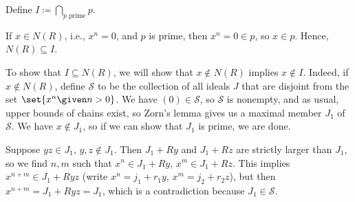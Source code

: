 Define $I\coloneqq \bigcap_{p\text{ prime}} p$.

If $x \in N(R)$, i.e., $x^n = 0$, and $p$ is prime, then $x^n = 0 \in p$, so
$x \in p$. Hence, $N(R) \subseteq I$.

To show that $I \subseteq N(R)$, we will show that $x \notin N(R)$ implies
$x \notin I$. Indeed, if $x \notin N(R)$, define $\mathcal{S}$ to be the collection
of all ideals $J$ that are disjoint from the set $\set{x^n \given n > 0}$.
We have $(0) \in \mathcal{S}$, so $\mathcal{S}$ is nonempty, and as usual,
upper bounds of chains exist, so Zorn's lemma gives us a maximal member
$J_1$ of $\mathcal{S}$. We have $x \notin J_1$, so if we can show that $J_1$ is
prime, we are done.

Suppose $yz \in J_1$, $y, z \notin J_1$. Then $J_1 + Ry$ and $J_1 + Rz$ are strictly
larger than $J_1$, so we find $n, m$ such that $x^n \in J_1 + Ry$, $x^m \in J_1 + Rz$.
This implies $x^{n + m} \in J_1 + Ryz$ (write $x^n = j_1+r_1y$, $x^m = j_2+r_2z$),
but then $x^{n + m} = J_1 + Ryz = J_1$, which is a contradiction because
$J_1 \in \mathcal{S}$.
